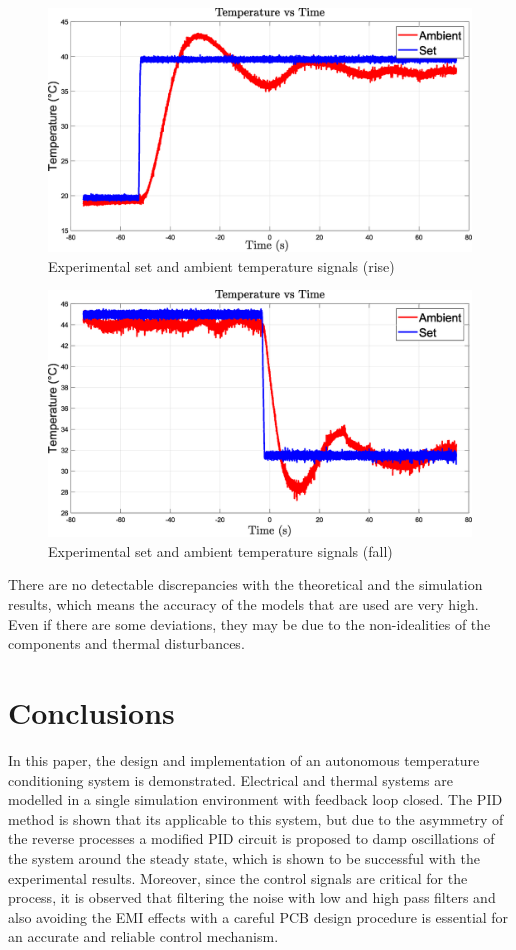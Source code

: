 \documentclass[conference]{IEEEtran}
\begin{document}
\begin{figure}
\centerline{\includegraphics[scale=0.31]{figures/pidRise.eps}}
\caption{Experimental set and ambient temperature signals (rise)}
\label{pidRise}
\end{figure}

\begin{figure}
\centerline{\includegraphics[scale=0.31]{figures/pidFall.eps}}
\caption{Experimental set and ambient temperature signals (fall)}
\label{pidFall}
\end{figure}

There are no detectable discrepancies with the theoretical and the simulation results, which means the accuracy of the models that are used are very high. Even if there are some deviations, they may be due to the non-idealities of the components and thermal disturbances.

\section{Conclusions}
In this paper, the design and implementation of an autonomous temperature conditioning system is demonstrated. Electrical and thermal systems are modelled in a single simulation environment with feedback loop closed. The PID method is shown that its applicable to this system, but due to the asymmetry of the reverse processes a modified PID circuit is proposed to damp oscillations of the system around the steady state, which is shown to be successful with the experimental results. Moreover, since the control signals are critical for the process, it is observed that filtering the noise with low and high pass filters and also avoiding the EMI effects with a careful PCB design procedure is essential for an accurate and reliable control mechanism.
\end{document}
